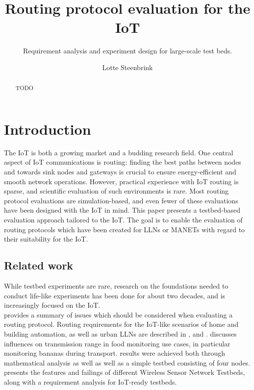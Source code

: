 \documentclass{acm_proc_article-sp}
\begin{document}
\title{Routing protocol evaluation for the IoT}
\subtitle{Requirement analysis and experiment design for large-scale test beds.}

\author{
\alignauthor
Lotte Steenbrink
}

\maketitle
\begin{abstract}
TODO
\end{abstract}


\section{Introduction}
\label{sec:Intro}
The \gls{IoT} is both a growing market and a budding research field. One central aspect of IoT communications is routing: finding the best paths between nodes and towards sink nodes and gateways is crucial to ensure energy-efficient and smooth network operations. However, practical experience with IoT routing is sparse, and scientific evaluation of such environments is rare. Most routing protocol evaluations are simulation-based, and even fewer of these evaluations have been designed with the IoT in mind.
This paper presents a testbed-based evaluation approach tailored to the IoT. The goal is to enable the evaluation of routing protocols which have been created for \glspl{LLN} or \glspl{MANET} with regard to their suitability for the IoT.

\subsection{Related work}
\label{subsec:related_work}
While testbed experiments are rare, research on the foundations needed to conduct life-like experiments has been done for about two decades, and is increasingly focused on the IoT.\\
\cite{RFC-2501} provides a summary of issues which should be considered when evaluating a routing protocol. Routing requirements for the IoT-like scenarios of home and building automation, as well as urban \glspl{LLN} are described in \cite{RFC-5826}, \cite{RFC-5867} and \cite{RFC-5548}.
\cite{food_monitoring} discusses influences on transmission range in food monitoring use cases, in particular monitoring bananas during transport. results were achieved both through mathematical analysis as well as well as a simple testbed consisting of four nodes.
\cite{testbed-survey} presents the features and failings of different Wireless Sensor Network Testbeds, along with a requirement analysis for IoT-ready testbeds.
\end{document}
